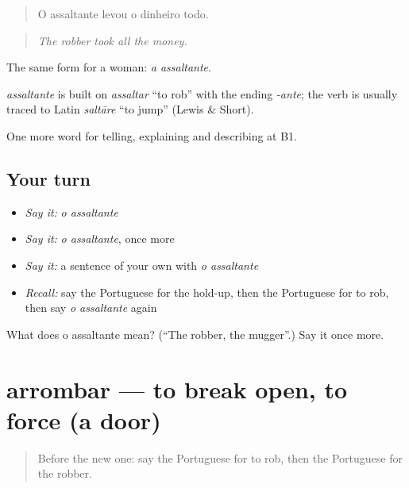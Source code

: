 \begin{quote}
O assaltante levou o dinheiro todo.
\end{quote}

\begin{quote}
\emph{The robber took all the money.}
\end{quote}

The same form for a woman: \emph{a assaltante}.

\begin{cousinweb}
\emph{assaltante} is built on \emph{assaltar} \textquotedblleft{}to rob\textquotedblright{} with the ending \emph{-ante}; the verb is usually traced to Latin \emph{saltāre} \textquotedblleft{}to jump\textquotedblright{} (Lewis \& Short).
\end{cousinweb}

\begin{grammarlens}[title={What you've built}]
One more word for telling, explaining and describing at B1.
\end{grammarlens}

\subsection*{Your turn}
\begin{itemize}
\raggedright
  \item \emph{Say it:} \emph{o assaltante}
  \item \emph{Say it:} \emph{o assaltante}, once more
  \item \emph{Say it:} a sentence of your own with \emph{o assaltante}
  \item \emph{Recall:} say the Portuguese for the hold-up, then the Portuguese for to rob, then say \emph{o assaltante} again
\end{itemize}

\begin{tcolorbox}[breakable,colback=teal!4,colframe=teal!35!black,title={Before you move on}]
What does o assaltante mean? (\textquotedblleft{}The robber, the mugger\textquotedblright{}.) Say it once more.
\end{tcolorbox}
\section[arrombar]{arrombar — to break open, to force (a door)}

\label{lesson:PT-C288-arrombar}



\begin{quote}
Before the new one: say the Portuguese for to rob, then the Portuguese for the robber.
\end{quote}

